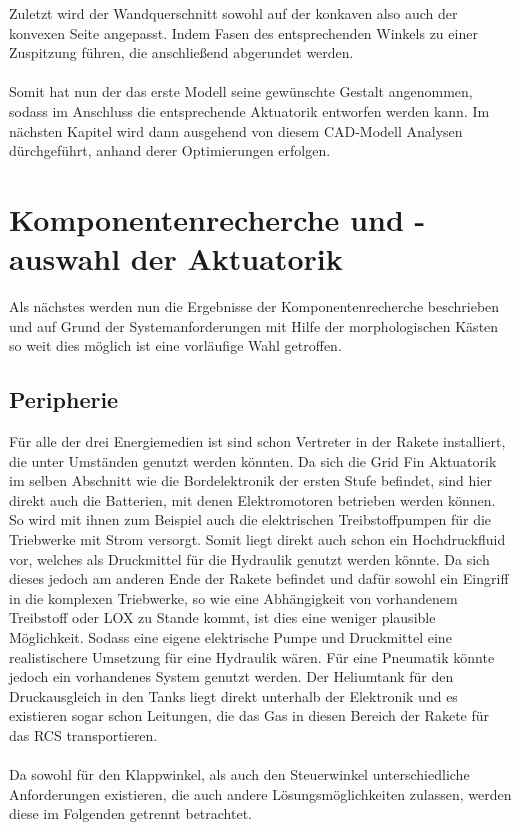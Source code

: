 Zuletzt wird der Wandquerschnitt sowohl auf der konkaven also auch der konvexen Seite angepasst. Indem Fasen des entsprechenden Winkels zu einer Zuspitzung führen, die anschließend abgerundet werden.
\\~\\
Somit hat nun der das erste Modell seine gewünschte Gestalt angenommen, sodass im Anschluss die entsprechende Aktuatorik entworfen werden kann. Im nächsten Kapitel wird dann ausgehend von diesem CAD-Modell Analysen dürchgeführt, anhand derer Optimierungen erfolgen. 
\section{Komponentenrecherche und -auswahl der Aktuatorik}
Als nächstes werden nun die Ergebnisse der Komponentenrecherche beschrieben und auf Grund der Systemanforderungen mit Hilfe der morphologischen Kästen so weit dies möglich ist eine vorläufige Wahl getroffen.
\subsection{Peripherie}
Für alle der drei Energiemedien ist sind schon Vertreter in der Rakete installiert, die unter Umständen genutzt werden könnten. Da sich die Grid Fin Aktuatorik im selben Abschnitt wie die Bordelektronik der ersten Stufe befindet, sind hier direkt auch die Batterien, mit denen Elektromotoren betrieben werden können. So wird mit ihnen zum Beispiel auch die elektrischen Treibstoffpumpen für die Triebwerke mit Strom versorgt. Somit liegt direkt auch schon ein Hochdruckfluid vor, welches als Druckmittel für die Hydraulik genutzt werden könnte. Da sich dieses jedoch am anderen Ende der Rakete befindet und dafür sowohl ein Eingriff in die komplexen Triebwerke, so wie eine Abhängigkeit von vorhandenem Treibstoff oder LOX zu Stande kommt, ist dies eine weniger plausible Möglichkeit. Sodass eine eigene elektrische Pumpe und Druckmittel eine realistischere Umsetzung für eine Hydraulik wären. Für eine Pneumatik könnte jedoch ein vorhandenes System genutzt werden. Der Heliumtank für den Druckausgleich in den Tanks liegt direkt unterhalb der Elektronik und es existieren sogar schon Leitungen, die das Gas in diesen Bereich der Rakete für das RCS transportieren.
\\~\\
Da sowohl für den Klappwinkel, als auch den Steuerwinkel unterschiedliche Anforderungen existieren, die auch andere Lösungsmöglichkeiten zulassen, werden diese im Folgenden getrennt betrachtet.
